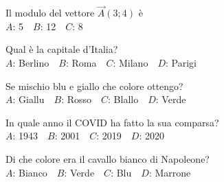 \mcquestionfooter



\def\mcquestionnumber{10}


\mcquestionheader Il modulo del vettore $\vec{A}(3;4)$ è\\
{$A$}: 5\ \ {$B$}: 12\ \ {$C$}: 8\ \ 

\mcquestionfooter



\def\mcquestionnumber{11}


\mcquestionheader Qual è la capitale d’Italia?\\
{$A$}: Berlino\ \ {$B$}: Roma\ \ {$C$}: Milano\ \ {$D$}: Parigi\ \ 

\mcquestionfooter



\def\mcquestionnumber{12}


\mcquestionheader Se mischio blu e giallo che colore ottengo?\\
{$A$}: Giallu\ \ {$B$}: Rosso\ \ {$C$}: Blallo\ \ {$D$}: Verde\ \ 

\mcquestionfooter



\mcpaperfooter

\def\mcserialnumber{27}
\mcpaperheader


\def\mcquestionnumber{1}


\mcquestionheader In quale anno il COVID ha fatto la sua comparsa?\\
{$A$}: 1943\ \ {$B$}: 2001\ \ {$C$}: 2019\ \ {$D$}: 2020\ \ 

\mcquestionfooter



\def\mcquestionnumber{2}


\mcquestionheader Di che colore era il cavallo bianco di Napoleone?\\
{$A$}: Bianco\ \ {$B$}: Verde\ \ {$C$}: Blu\ \ {$D$}: Marrone\ \ 

\mcquestionfooter



\def\mcquestionnumber{3}


